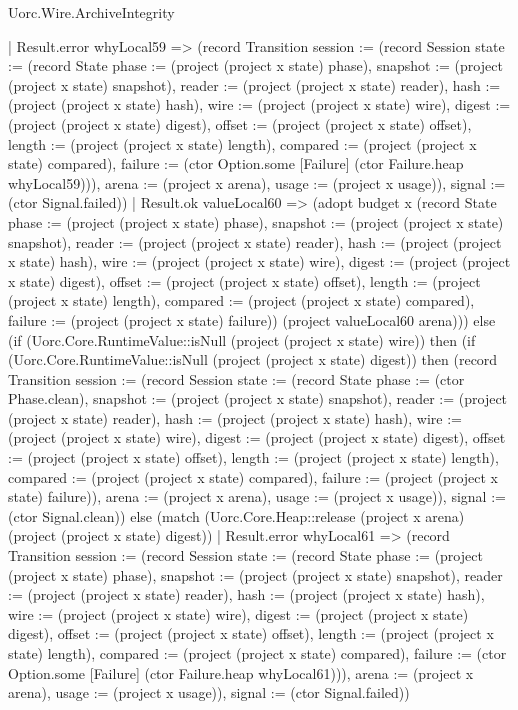 \begin{lexlean}{Uorc.Wire.ArchiveIntegrity}
\begin{semanticmodule}
{      | Result.error whyLocal59 => (record Transition {session := (record Session {state := (record State {phase := (project (project x state) phase), snapshot := (project (project x state) snapshot), reader := (project (project x state) reader), hash := (project (project x state) hash), wire := (project (project x state) wire), digest := (project (project x state) digest), offset := (project (project x state) offset), length := (project (project x state) length), compared := (project (project x state) compared), failure := (ctor Option.some [Failure] (ctor Failure.heap whyLocal59))}), arena := (project x arena), usage := (project x usage)}), signal := (ctor Signal.failed)})
      | Result.ok valueLocal60 => (adopt budget x (record State {phase := (project (project x state) phase), snapshot := (project (project x state) snapshot), reader := (project (project x state) reader), hash := (project (project x state) hash), wire := (project (project x state) wire), digest := (project (project x state) digest), offset := (project (project x state) offset), length := (project (project x state) length), compared := (project (project x state) compared), failure := (project (project x state) failure)}) (project valueLocal60 arena))) else (if (Uorc.Core.RuntimeValue::isNull (project (project x state) wire)) then (if (Uorc.Core.RuntimeValue::isNull (project (project x state) digest)) then (record Transition {session := (record Session {state := (record State {phase := (ctor Phase.clean), snapshot := (project (project x state) snapshot), reader := (project (project x state) reader), hash := (project (project x state) hash), wire := (project (project x state) wire), digest := (project (project x state) digest), offset := (project (project x state) offset), length := (project (project x state) length), compared := (project (project x state) compared), failure := (project (project x state) failure)}), arena := (project x arena), usage := (project x usage)}), signal := (ctor Signal.clean)}) else (match (Uorc.Core.Heap::release (project x arena) (project (project x state) digest))
      | Result.error whyLocal61 => (record Transition {session := (record Session {state := (record State {phase := (project (project x state) phase), snapshot := (project (project x state) snapshot), reader := (project (project x state) reader), hash := (project (project x state) hash), wire := (project (project x state) wire), digest := (project (project x state) digest), offset := (project (project x state) offset), length := (project (project x state) length), compared := (project (project x state) compared), failure := (ctor Option.some [Failure] (ctor Failure.heap whyLocal61))}), arena := (project x arena), usage := (project x usage)}), signal := (ctor Signal.failed)})
}
\end{semanticmodule}
\end{lexlean}

